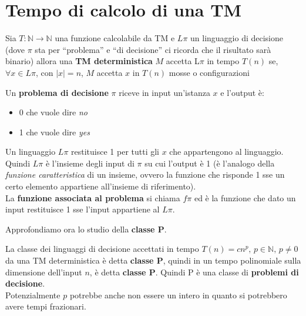 \documentclass[a4paper,12pt, oneside]{book}
\begin{document}
\section{Tempo di calcolo di una TM}
\begin{definizione}
  Sia $T:\mathbb{N}\to \mathbb{N}$ una funzione calcolabile da TM e $L\pi$ un
  linguaggio di decisione (dove $\pi$ sta per ``problema'' e ``di decisione'' ci
  ricorda che il risultato sarà binario) allora una \textbf{TM deterministica}
  $M$ accetta L$\pi$ in tempo $T(n)$ se, $\forall x\in L\pi$, con $|x|=n$, $M$
  accetta $x$ in $T(n)$ mosse o configurazioni
\end{definizione}
\begin{definizione}
  Un \textbf{problema di decisione} $\pi$ riceve in input un'istanza $x$ e
  l'output è:
  \begin{itemize}
    \item 0 che vuole dire \textit{no}
    \item 1 che vuole dire \textit{yes}
  \end{itemize}
  Un linguaggio $L\pi$ restituisce 1 per tutti gli $x$ che appartengono al
  linguaggio. Quindi $L\pi$ è l'insieme degli input di $\pi$ su cui l'output è
  1 (è l'analogo della \emph{funzione caratteristica} di un insieme, ovvero la
  funzione che risponde 1 sse un certo elemento appartiene all'insieme di
  riferimento).\\
  La \textbf{funzione associata al problema} si chiama $f\pi$ ed è la funzione
  che dato un input restituisce 1 sse l'input appartiene al $L\pi$.
\end{definizione}
Approfondiamo ora lo studio della \textbf{classe P}.
\begin{definizione}
  La classe dei linguaggi di decisione accettati in tempo
  $T(n)=cn^p,\,p\in\mathbb{N},\, p\neq 0$ da una TM deterministica è detta
  \textbf{classe P}, quindi in un tempo polinomiale sulla dimensione dell'input
  $n$, è detta \textbf{classe P}. Quindi P è una classe di \textbf{problemi di
    decisione}. \\
  Potenzialmente $p$ potrebbe anche non essere un intero in quanto si potrebbero
  avere tempi frazionari.
\end{definizione}
\end{document}
